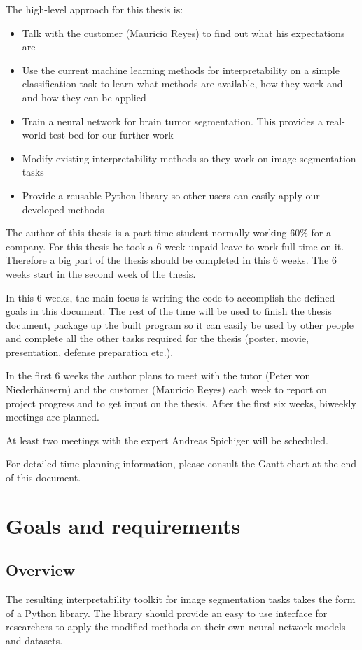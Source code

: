 The high-level approach for this thesis is:
\begin{itemize}
    \item Talk with the customer (Mauricio Reyes) to find out what his expectations are
    \item Use the current machine learning methods for interpretability on a simple classification task to learn what methods are available, how they work and and how they can be applied
    \item Train a neural network for brain tumor segmentation. This provides a real-world test bed for our further work
    \item Modify existing interpretability methods so they work on image segmentation tasks
    \item Provide a reusable Python library so other users can easily apply our developed methods
\end{itemize}

The author of this thesis is a part-time student normally working 60\% for a company. For this thesis he took a 6 week unpaid leave to work full-time on it.
Therefore a big part of the thesis should be completed in this 6 weeks. The 6 weeks start in the second week of the thesis.

In this 6 weeks, the main focus is writing the code to accomplish the defined goals in this document. The rest of the time will be used to finish the thesis document, package up the built program so it can easily be used by other people and complete all the other tasks required for the thesis (poster, movie, presentation, defense preparation etc.).

In the first 6 weeks the author plans to meet with the tutor (Peter von Niederhäusern) and the customer (Mauricio Reyes) each week to report on project progress and to get input on the thesis.
After the first six weeks, biweekly meetings are planned.

At least two meetings with the expert Andreas Spichiger will be scheduled.

For detailed time planning information, please consult the Gantt chart at the end of this document.

\chapter{Goals and requirements}

\section{Overview}
The resulting interpretability toolkit for image segmentation tasks takes the form of a Python library. The library should provide an easy to use interface for researchers to apply
the modified methods on their own neural network models and datasets.


